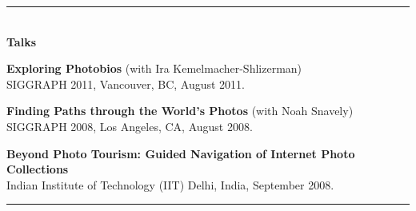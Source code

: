 \documentclass[10pt]{article}
\newenvironment{itemize*}%
  {\begin{itemize}%
    \setlength{\itemsep}{0pt}%
    \setlength{\parskip}{0pt}%
	}
  {\end{itemize}}
\begin{document}
\rule{6.5in}{2pt}
\\
\vspace{0.10in}
{\large \textbf{Talks}}
\begin{itemize*}
\item \textbf{Exploring Photobios} (with Ira Kemelmacher-Shlizerman) 
\\
SIGGRAPH 2011, Vancouver, BC, August 2011.
\item \textbf{Finding Paths through the World's Photos} (with Noah Snavely) 
\\
SIGGRAPH 2008, Los Angeles, CA, August 2008.
\item \textbf{Beyond Photo Tourism: Guided Navigation of Internet Photo Collections} 
\\
Indian Institute of Technology (IIT) Delhi, India, September 2008.
\end{itemize*}
\rule{6.5in}{2pt}
\end{document}
